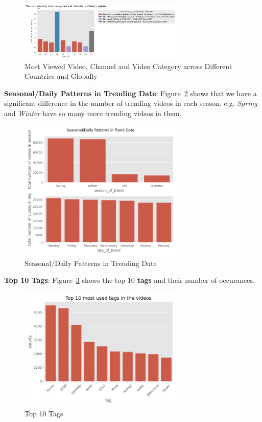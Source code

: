 \documentclass[a4paper,12pt]{article}
\begin{document}
\begin{figure}[H]
    \centering
    \includegraphics[width=0.7\textwidth]{./images/most_trend_cats_and_chanells_diff_regions.png}
    \caption{Most Viewed Video, Channel and Video Category across Different Countries and Globally}
    \label{fig:Figure_7}
\end{figure}


\noindent \textbf{Seasonal/Daily Patterns in Trending Date}: Figure~\ref{fig:Figure_8} shows that we have a significant difference in the number of trending videos in each season. e.g. \textit{Spring} and \textit{Winter} 
have so many more trending videos in them. 

\begin{figure}[H]
    \centering
    \includegraphics[width=0.7\textwidth]{./images/seasonal_daily_patterns_in_trend_date.png}
    \caption{Seasonal/Daily Patterns in Trending Date}
    \label{fig:Figure_8}
\end{figure}


\noindent \textbf{Top 10 Tags}: Figure~\ref{fig:Figure_9} shows the top 10 \textbf{tags} and their number of occurances.

\begin{figure}[H]
    \centering
    \includegraphics[width=0.7\textwidth]{./images/top_ten_most_used_tags.png}
    \caption{Top 10 Tags}
    \label{fig:Figure_9}
\end{figure}
\end{document}
